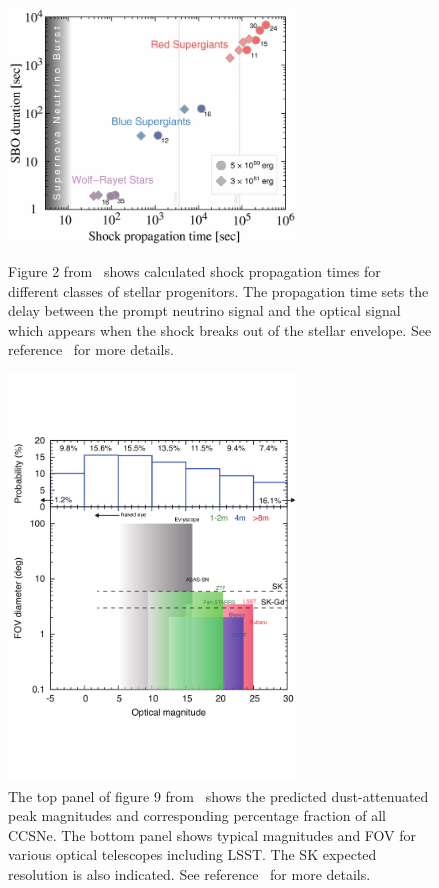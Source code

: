 \documentclass[12pt, letterpaper]{article}
\begin{document}
\begin{figure}
  \begin{center}
    \begin{minipage}[b]{3.1in}
      \includegraphics[width=3.0in]{apj487119f2_hr}
      \caption{Figure 2 from~\cite{2013ApJ...778...81K} shows
        calculated shock propagation times for different classes of
        stellar progenitors.  The propagation time sets the delay
        between the prompt neutrino signal and the optical signal
        which appears when the shock breaks out of the stellar
        envelope.  See reference~\cite{2013ApJ...778...81K} for more
        details. }
      \label{fig:delay-times}
    \end{minipage}
    \hspace{0.2in}
    \begin{minipage}[b]{3.1in}
      \includegraphics[width=3.0in]{fig9}
      \caption{The top panel of figure 9
        from~\cite{2016MNRAS.461.3296N} shows the predicted
        dust-attenuated peak magnitudes and corresponding percentage
        fraction of all CCSNe.  The bottom panel shows typical
        magnitudes and FOV for various optical telescopes including
        LSST.  The SK expected resolution is also indicated.  See
        reference~\cite{2016MNRAS.461.3296N} for more details.}
      \label{fig:multimessenger-comparison}
    \end{minipage}
  \end{center}
\end{figure}
\end{document}

